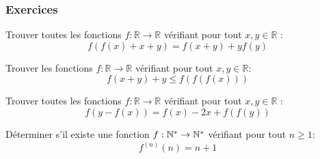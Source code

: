 \subsubsection{Exercices}
\begin{exo} %
Trouver toutes les fonctions $f:\mathbb{R}\rightarrow \mathbb{R}$ vérifiant pour tout $x,y\in \mathbb{R}$ :
$$f(f(x)+x+y) = f(x+y) + y f(y)$$
\end{exo}


\begin{exo}
Trouver les fonctions $f:\mathbb{R}\rightarrow \mathbb{R}$ vérifiant pour tout $x,y\in \mathbb{R}:$
$$f(x+y)+y\le f(f(f(x)))$$
\end{exo}


\begin{exo} %
Trouver toutes les fonctions $f:\mathbb{R}\rightarrow \mathbb{R}$ vérifiant pour tout $x,y\in \mathbb{R}$ :
$$f(y-f(x))=f(x)-2x+f(f(y))$$
\end{exo}




\begin{exo}
Déterminer s'il existe une fonction $f: \mathbb N^* \rightarrow \mathbb N^*$ vérifiant pour tout $n\ge 1$: $$f^{(n)}(n)=n+1$$
\end{exo}


